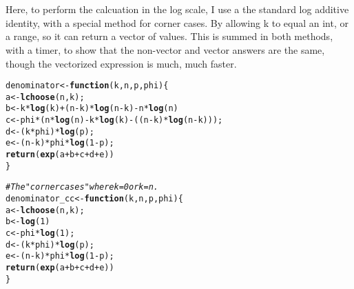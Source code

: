 \documentclass{article}\usepackage[]{graphicx}\usepackage[]{color}
\makeatletter
\newcommand{\hlnum}[1]{\textcolor[rgb]{0.686,0.059,0.569}{#1}}%
\newcommand{\hlcom}[1]{\textcolor[rgb]{0.678,0.584,0.686}{\textit{#1}}}%
\newcommand{\hlopt}[1]{\textcolor[rgb]{0,0,0}{#1}}%
\newcommand{\hlstd}[1]{\textcolor[rgb]{0.345,0.345,0.345}{#1}}%
\newcommand{\hlkwa}[1]{\textcolor[rgb]{0.161,0.373,0.58}{\textbf{#1}}}%
\newcommand{\hlkwb}[1]{\textcolor[rgb]{0.69,0.353,0.396}{#1}}%
\newcommand{\hlkwc}[1]{\textcolor[rgb]{0.333,0.667,0.333}{#1}}%
\newcommand{\hlkwd}[1]{\textcolor[rgb]{0.737,0.353,0.396}{\textbf{#1}}}%
\newenvironment{kframe}{%
 \def\at@end@of@kframe{}%
 \ifinner\ifhmode%
  \def\at@end@of@kframe{\end{minipage}}%
  \begin{minipage}{\columnwidth}%
 \fi\fi%
 \def\FrameCommand##1{\hskip\@totalleftmargin \hskip-\fboxsep
 \colorbox{shadecolor}{##1}\hskip-\fboxsep
     \hskip-\linewidth \hskip-\@totalleftmargin \hskip\columnwidth}%
 \MakeFramed {\advance\hsize-\width
   \@totalleftmargin\z@ \linewidth\hsize
   \@setminipage}}%
 {\par\unskip\endMakeFramed%
 \at@end@of@kframe}
\newenvironment{knitrout}{}{} %
\makeatother
\begin{document}
\section{}

Here, to perform the calcuation in the log scale, I use a the standard log additive identity, with a special method for corner cases.  By allowing k to equal an int, or a range, so it can return a vector of values.  This is summed in both methods, with a timer, to show that the non-vector and vector answers are the same, though the vectorized expression is much, much faster. 

\begin{knitrout}
\color{fgcolor}\begin{kframe}
\begin{alltt}
\hlstd{denominator} \hlkwb{<-} \hlkwa{function}\hlstd{(}\hlkwc{k}\hlstd{,}\hlkwc{n}\hlstd{,}\hlkwc{p}\hlstd{,}\hlkwc{phi}\hlstd{) \{}
  \hlstd{a} \hlkwb{<-} \hlkwd{lchoose}\hlstd{(n,k);}
  \hlstd{b} \hlkwb{<-} \hlstd{k}\hlopt{*}\hlkwd{log}\hlstd{(k)} \hlopt{+} \hlstd{(n}\hlopt{-}\hlstd{k)}\hlopt{*}\hlkwd{log}\hlstd{(n}\hlopt{-}\hlstd{k)} \hlopt{-} \hlstd{n}\hlopt{*}\hlkwd{log}\hlstd{(n)}
  \hlstd{c} \hlkwb{<-} \hlstd{phi} \hlopt{*} \hlstd{(n}\hlopt{*}\hlkwd{log}\hlstd{(n)} \hlopt{-} \hlstd{k}\hlopt{*}\hlkwd{log}\hlstd{(k)} \hlopt{-} \hlstd{((n}\hlopt{-}\hlstd{k)}\hlopt{*}\hlkwd{log}\hlstd{(n}\hlopt{-}\hlstd{k)));}
  \hlstd{d} \hlkwb{<-} \hlstd{(k}\hlopt{*}\hlstd{phi)}\hlopt{*}\hlkwd{log}\hlstd{(p);}
  \hlstd{e} \hlkwb{<-} \hlstd{(n}\hlopt{-}\hlstd{k)}\hlopt{*}\hlstd{phi}\hlopt{*}\hlkwd{log}\hlstd{(}\hlnum{1}\hlopt{-}\hlstd{p);}
  \hlkwd{return}\hlstd{(}\hlkwd{exp}\hlstd{(a} \hlopt{+} \hlstd{b} \hlopt{+} \hlstd{c} \hlopt{+} \hlstd{d} \hlopt{+} \hlstd{e))}
\hlstd{\}}

\hlcom{# The "corner cases" where k=0 or k=n.}
\hlstd{denominator_cc} \hlkwb{<-} \hlkwa{function}\hlstd{(}\hlkwc{k}\hlstd{,}\hlkwc{n}\hlstd{,}\hlkwc{p}\hlstd{,}\hlkwc{phi}\hlstd{) \{}
  \hlstd{a} \hlkwb{<-} \hlkwd{lchoose}\hlstd{(n,k);}
  \hlstd{b} \hlkwb{<-} \hlkwd{log}\hlstd{(}\hlnum{1}\hlstd{)}
  \hlstd{c} \hlkwb{<-} \hlstd{phi} \hlopt{*} \hlkwd{log}\hlstd{(}\hlnum{1}\hlstd{);}
  \hlstd{d} \hlkwb{<-} \hlstd{(k}\hlopt{*}\hlstd{phi)}\hlopt{*}\hlkwd{log}\hlstd{(p);}
  \hlstd{e} \hlkwb{<-} \hlstd{(n}\hlopt{-}\hlstd{k)}\hlopt{*}\hlstd{phi}\hlopt{*}\hlkwd{log}\hlstd{(}\hlnum{1}\hlopt{-}\hlstd{p);}
  \hlkwd{return}\hlstd{(}\hlkwd{exp}\hlstd{(a} \hlopt{+} \hlstd{b} \hlopt{+} \hlstd{c} \hlopt{+} \hlstd{d} \hlopt{+} \hlstd{e))}
\hlstd{\}}


\end{alltt}
\end{kframe}
\end{knitrout}
\end{document}
